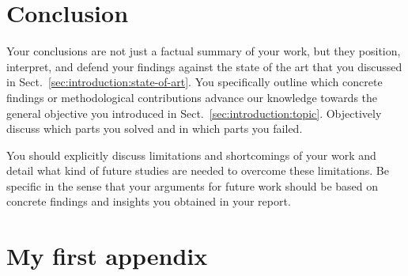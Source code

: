 \documentclass[12pt,a4paper,footinclude=true,twoside,headinclude=true]{report}
\begin{document}
\chapter{Conclusion}\label{sec:conclusion}

Your conclusions are not just a factual summary of your work, but they position,  interpret, and defend your findings against the state of the art that you discussed in Sect.~\ref{sec:introduction:state-of-art}. You specifically outline which concrete findings or methodological contributions advance our knowledge towards the general objective you introduced in Sect.~\ref{sec:introduction:topic}. Objectively discuss which parts you solved and in which parts you failed.

You should explicitly discuss limitations and shortcomings of your work and detail what kind of future studies are needed to overcome these limitations. Be specific in the sense that your arguments for future work should be based on concrete findings and insights you obtained in your report. 





\appendix 
{}

\listoffigures
\listoftables

\chapter{My first appendix}\label{sec:appendix1}
\end{document}
